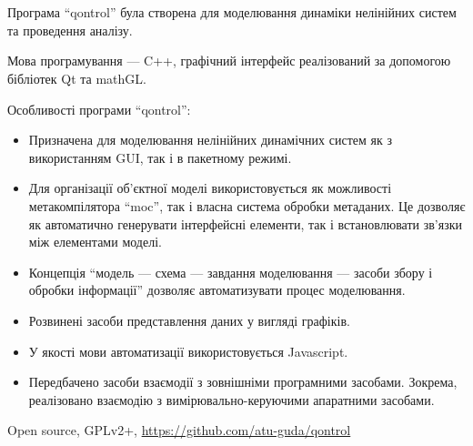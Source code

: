 \documentclass[14pt,handout,utf8]{beamer}
\newcommand{\Xhead}[1]{
 \begin{center}%
      \textbf{#1}%
 \end{center}%
}
\begin{document}

\begin{frame}
  \frametitle{~}

  Програма ``qontrol'' була створена для моделювання динаміки
  нелінійних систем та проведення аналізу.

  Мова програмування --- C++,
  графічний інтерфейс реалізований за допомогою
  бібліотек Qt та mathGL.

  \Xhead{}
  Особливості програми ``qontrol'':

  \begin{itemize}

    \item
      Призначена для моделювання нелінійних динамічних систем як з
      використанням GUI, так і в пакетному режимі.

    \item
      Для організації об'єктної моделі використовується як можливості
      метакомпілятора ``moc'', так і власна система обробки метаданих. Це
      дозволяє як автоматично генерувати інтерфейсні елементи, так
      і встановлювати зв'язки між елементами моделі.

    \item
      Концепція ``модель --- схема --- завдання моделювання --- засоби збору і обробки інформації''
      дозволяє автоматизувати процес
      моделювання.

    \item
     Розвинені засоби представлення даних у вигляді графіків.

    \item
      У якості мови автоматизації використовується Javascript.

    \item
      Передбачено засоби взаємодії з зовнішніми програмними
      засобами. Зокрема, реалізовано взаємодію з
      вимірювально-керуючими апаратними засобами.


  \end{itemize}

  Open source, GPLv2+, \url{https://github.com/atu-guda/qontrol}


\end{frame}



\end{document}
